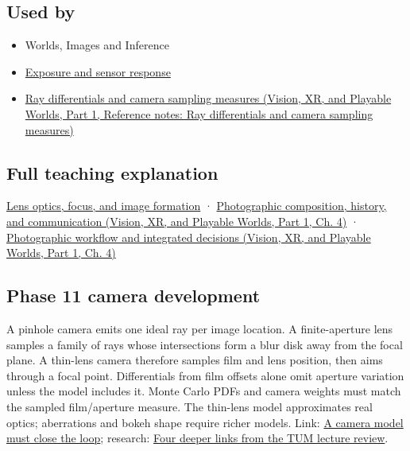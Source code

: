 \subsection{Used by}\label{appendix-21f8456e2629-used-by}

\hypertarget{appendix-21f8456e2629-used-by}{}

\begin{itemize}
\item
  {Worlds, Images and Inference}
\item
  \hyperref[appendix-92d45cdf2afc]{Exposure and sensor response}
\item
  \href{../07-Vision-XR-and-Playable-Worlds-P01/main.pdf\#appendix-8c40fad29462}{Ray differentials and camera sampling measures (Vision, XR, and Playable Worlds, Part 1, Reference notes: Ray differentials and camera sampling measures)}
\end{itemize}

\subsection{Full teaching explanation}\label{appendix-21f8456e2629-full-teaching-explanation}

\hypertarget{appendix-21f8456e2629-full-teaching-explanation}{}

\hyperref[03-visual-computing-i-ch003-lens-optics-focus-and-image-formation]{Lens optics, focus, and image formation} · \href{../07-Vision-XR-and-Playable-Worlds-P01/main.pdf\#04-visual-computing-ii-ch034-photographic-composition-history-and-communication}{Photographic composition, history, and communication (Vision, XR, and Playable Worlds, Part 1, Ch. 4)} · \href{../07-Vision-XR-and-Playable-Worlds-P01/main.pdf\#04-visual-computing-ii-ch034-photographic-workflow-and-integrated-decisions}{Photographic workflow and integrated decisions (Vision, XR, and Playable Worlds, Part 1, Ch. 4)}

\subsection{Phase 11 camera development}\label{appendix-21f8456e2629-phase-11-camera-development}

\hypertarget{appendix-21f8456e2629-phase-11-camera-development}{}

A pinhole camera emits one ideal ray per image location. A finite-aperture lens samples a family of rays whose intersections form a blur disk away from the focal plane. A thin-lens camera therefore samples film and lens position, then aims through a focal point. Differentials from film offsets alone omit aperture variation unless the model includes it. Monte Carlo PDFs and camera weights must match the sampled film/aperture measure. The thin-lens model approximates real optics; aberrations and bokeh shape require richer models. Link: \hyperref[02-foundations-ii-ch037-a-camera-model-must-close-the-loop]{A camera model must close the loop}; research: \hyperref[02-foundations-ii-ch036-four-deeper-links-from-the-tum-lecture-review]{Four deeper links from the TUM lecture review}.

